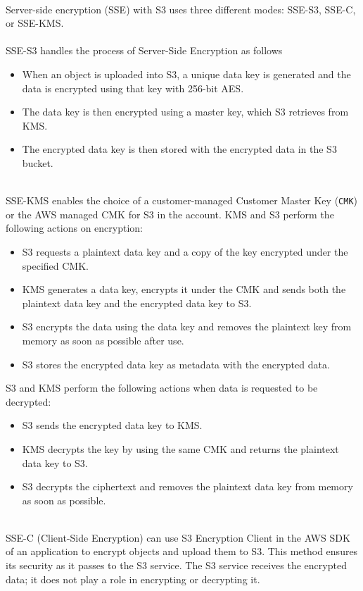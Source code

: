 \documentclass[10pt]{article}
\begin{document}
\    \\
Server-side encryption (SSE) with S3 uses three different modes: SSE-S3, SSE-C, or SSE-KMS.
\\ \\
SSE-S3 handles the process of Server-Side Encryption as follows \cite{encryption-with-aws-kms}
\begin{itemize}
	\item When an object is uploaded into S3, a unique data key is generated and the data is encrypted using that key with 256-bit AES.
	\item The data key is then encrypted using a master key, which S3 retrieves from KMS.
	\item The encrypted data key is then stored with the encrypted data in the S3 bucket.
\end{itemize}
\	\\
SSE-KMS enables the choice of a customer-managed Customer Master Key (\texttt{CMK}) or the AWS managed CMK for S3 in the account. KMS and S3 perform the following actions on encryption:
\begin{itemize}
  \item S3 requests a plaintext data key and a copy of the key encrypted under the specified CMK.
  \item KMS generates a data key, encrypts it under the CMK and sends both the plaintext data key and the encrypted data key to S3.
  \item S3 encrypts the data using the data key and removes the plaintext key from memory as soon as possible after use.
  \item S3 stores the encrypted data key as metadata with the encrypted data.
\end{itemize}

S3 and KMS perform the following actions when data is requested to be decrypted:
\begin{itemize}
    \item S3 sends the encrypted data key to KMS.
    \item KMS decrypts the key by using the same CMK and returns the plaintext data key to S3.
    \item S3 decrypts the ciphertext and removes the plaintext data key from memory as soon as possible.
\end{itemize}
\  \\
SSE-C (Client-Side Encryption) can use S3 Encryption Client in the AWS SDK of an application to encrypt objects and upload them to S3. This method ensures its security as it passes to the S3 service. The S3 service receives the encrypted data; it does not play a role in encrypting or decrypting it.
\end{document}
